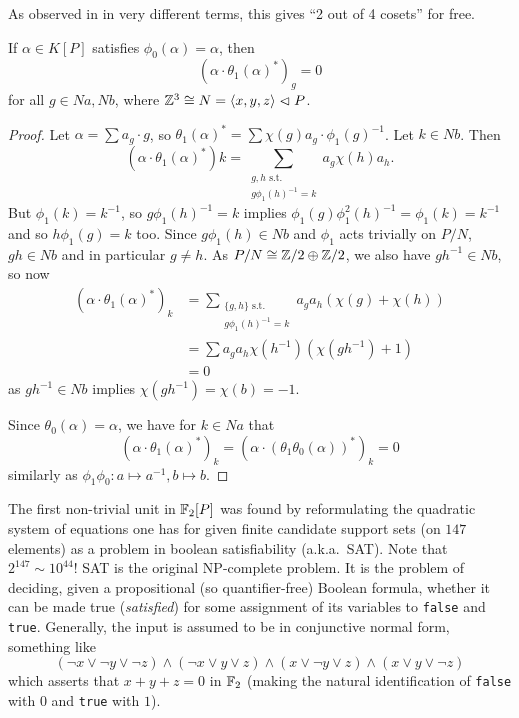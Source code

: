 As observed in \cite[Lemma 1]{Gardam21} in very different terms, this gives ``2 out of 4 cosets'' for free.

\begin{lemma}
    If $\alpha \in K[P]$ satisfies $\phi_0(\alpha) = \alpha$, then \[
        \left( \alpha \cdot \theta_1(\alpha)^* \right)_g = 0
    \] for all $g \in Na, Nb$, where $\mathbb{Z}^3 \cong N = \langle x, y, z \rangle \vartriangleleft P$.
\end{lemma}

\begin{proof}
    Let $\alpha = \sum a_g \cdot g$, so $\theta_1(\alpha)^* = \sum \chi(g) a_g \cdot \phi_1(g)^{-1}$.
    Let $k \in Nb$.
    Then \[
        \left( \alpha \cdot \theta_1(\alpha)^* \right)k = \sum_{\substack{g, h \text{ s.t.} \\ g \phi_1(h)^{-1} = k}} a_g \chi(h) a_h.
    \]
    But $\phi_1(k) = k^{-1}$, so $g \phi_1(h)^{-1} = k$ implies $\phi_1(g) \phi_1^2(h)^{-1} = \phi_1(k) = k^{-1}$ and so $h \phi_1(g) = k$ too.
    Since $g \phi_1(h) \in Nb$ and $\phi_1$ acts trivially on $P / N$, $gh \in Nb$ and in particular $g \neq h$.
    As $P / N \cong \mathbb{Z}/2 \oplus \mathbb{Z}/2$, we also have $gh^{-1} \in Nb$, so now
    \begin{align*}
        \left( \alpha \cdot \theta_1(\alpha)^* \right)_k
            &= \sum_{\substack{\{g, h\} \text{ s.t.} \\ g \phi_1(h)^{-1} = k}} a_g a_h (\chi(g) + \chi(h)) \\
            &= \sum a_g a_h \chi(h^{-1}) (\chi(g h^{-1}) + 1) \\
            &= 0
    \end{align*}
    as $g h^{-1} \in Nb$ implies $\chi(gh^{-1}) = \chi(b) = -1$.

    Since $\theta_0(\alpha) = \alpha$, we have for $k \in Na$ that \[
        \left( \alpha \cdot \theta_1(\alpha)^* \right)_k = \left( \alpha \cdot (\theta_1 \theta_0(\alpha))^* \right)_k = 0
    \] similarly as $\phi_1 \phi_0 \colon a \mapsto a^{-1}, b \mapsto b$.
\end{proof}

\begin{remark}
    The first non-trivial unit in $\mathbb{F}_2[P]$ was found by reformulating the quadratic system of equations one has for given finite candidate support sets (on $147$ elements) as a problem in boolean satisfiability (a.k.a.\ SAT).
    Note that $2^{147} \sim 10^{44}$!
    SAT is the original NP-complete problem.
    It is the problem of deciding, given a propositional (so quantifier-free) Boolean formula, whether it can be made true (\emph{satisfied}) for some assignment of its variables to \texttt{false} and \texttt{true}.
    Generally, the input is assumed to be in conjunctive normal form, something like \[
        (\neg x \vee \neg y \vee \neg z) \wedge (\neg x \vee y \vee z) \wedge (x \vee \neg y \vee z) \wedge (x \vee y \vee \neg z)
    \]
    which asserts that $x + y + z = 0$ in $\mathbb{F}_2$ (making the natural identification of \texttt{false} with $0$ and \texttt{true} with $1$).
\end{remark}

